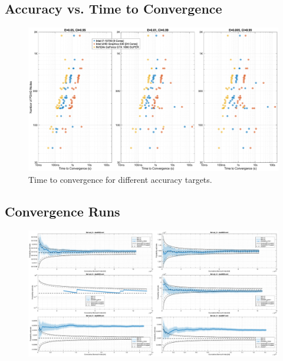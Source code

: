 \subsection{Accuracy vs. Time to Convergence}
\begin{frame}
\begin{figure}[p]
    \centering
    \includegraphics[height=1\textheight]{4_casestudy/throughput/slides_nodes_vs_convergence.eps}
    \caption{Time to convergence for different accuracy targets.}
    \label{fig:nodes_vs_convergence}
\end{figure}
\end{frame}

\subsection{Convergence Runs}
\begin{frame}
\begin{figure}[p]
    \centering
    \includegraphics[height=1\textheight]{4_casestudy/conv_raw.eps}
    \label{fig:convergence_run_01}
\end{figure}
\end{frame}

